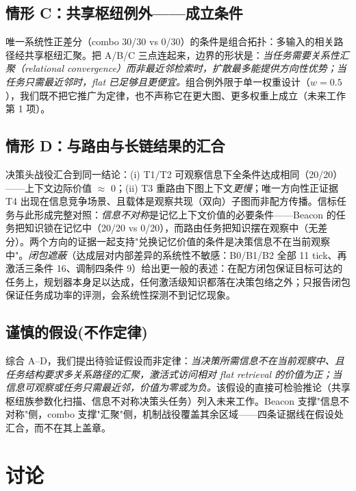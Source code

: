 \documentclass[10pt,a4paper]{ctexart}
\begin{document}
\subsection{情形 C：共享枢纽例外——成立条件}
唯一系统性正差分（combo 30/30 vs 0/30）的条件是组合拓扑：多输入的相关路径经共享枢纽汇聚。把 A/B/C 三点连起来，边界的形状是：\emph{当任务需要关系性汇聚（relational convergence）而非最近邻检索时，扩散最多能提供方向性优势；当任务只需最近邻时，flat 已足够且更便宜。}组合例外限于单一权重设计（$w{=}0.5$），我们既不把它推广为定律，也不声称它在更大图、更多权重上成立（未来工作第 1 项）。

\subsection{情形 D：与路由与长链结果的汇合}
决策头战役汇合到同一结论：(i) T1/T2 可观察信息下全条件达成相同（20/20）——上下文边际价值 $\approx$ 0；(ii) T3 重路由下图上下文\emph{更慢}；唯一方向性正证据 T4 出现在信息竞争场景、且载体是观察共现（双向）子图而非配方传播。信标任务与此形成完整对照：\emph{信息不对称}是记忆上下文价值的必要条件——Beacon 的任务把知识锁在记忆中（20/20 vs 0/20），而路由任务把知识摆在观察中（无差分）。两个方向的证据一起支持"兑换记忆价值的条件是决策信息不在当前观察中"。\emph{闭包遮蔽}（达成层对内部差异的系统性不敏感：B0/B1/B2 全部 11 tick、再激活三条件 16、调制四条件 9）给出更一般的表述：在配方闭包保证目标可达的任务上，规划器本身足以达成，任何激活级知识都落在决策包络之外；只报告闭包保证任务成功率的评测，会系统性探测不到记忆现象。

\subsection{谨慎的假设(不作定律)}
\label{sec:whydiff-hyp}
综合 A--D，我们提出待验证假设而非定律：\emph{当决策所需信息不在当前观察中、且任务结构要求多关系路径的汇聚，激活式访问相对 flat retrieval 的价值为正；当信息可观察或任务只需最近邻，价值为零或为负。}该假设的直接可检验推论（共享枢纽族参数化扫描、信息不对称决策头任务）列入未来工作。Beacon 支撑"信息不对称"侧，combo 支撑"汇聚"侧，机制战役覆盖其余区域——四条证据线在假设处汇合，而不在其上盖章。

\section{讨论}
\label{sec:discussion}
\end{document}
